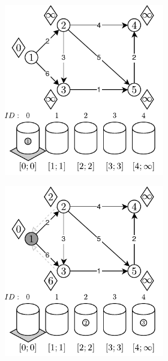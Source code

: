 \begin{figure}[!htbp]
	\centering
	\begin{subfigure}[b]{\textwidth}
		\null\hfill
		\begin{subfigure}[b]{0.32\textwidth}
			\includegraphics[width=\textwidth]{Chapter_II/OVERFLOW-BUCKET-Example/a.pdf}
			\caption{}
			\label{fig:exampleOverflowBucket:a}
		\end{subfigure}
		\hfill
		\begin{subfigure}[b]{0.32\textwidth}
			\includegraphics[width=\textwidth]{Chapter_II/OVERFLOW-BUCKET-Example/b.pdf}

\end{subfigure}
\end{subfigure}
\end{figure}
